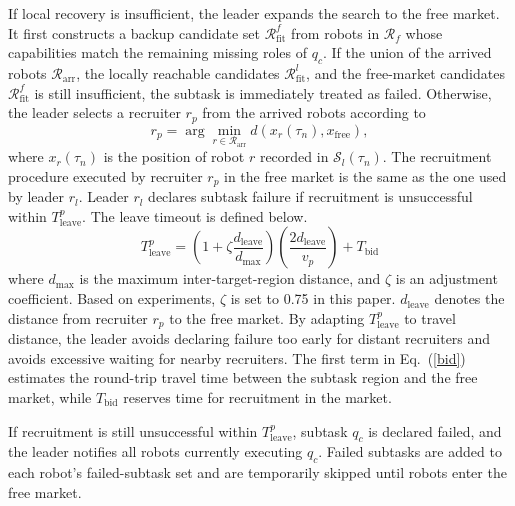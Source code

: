 \documentclass[lettersize,journal]{IEEEtran}
\begin{document}
If local recovery is insufficient, the leader expands the search to the free market. It first constructs a backup candidate set $\mathcal{R}_{\mathrm{fit}}^{f}$ from robots in $\mathcal{R}_f$ whose capabilities match the remaining missing roles of $q_c$. If the union of the arrived robots $\mathcal{R}_{\mathrm{arr}}$, the locally reachable candidates $\mathcal{R}_{\mathrm{fit}}^{l}$, and the free-market candidates $\mathcal{R}_{\mathrm{fit}}^{f}$ is still insufficient, the subtask is immediately treated as failed. Otherwise, the leader selects a recruiter $r_p$ from the arrived robots according to
\begin{equation*}
    r_p = \arg\min_{r \in \mathcal{R}_{\mathrm{arr}}} d(x_r(\tau_n), x_{\mathrm{free}}),
\end{equation*}
where $x_r(\tau_n)$ is the position of robot $r$ recorded in $\mathcal{S}_l(\tau_n)$. The recruitment procedure executed by recruiter $r_p$ in the free market is the same as the one used by leader $r_l$. Leader $r_l$ declares subtask failure if recruitment is unsuccessful within $T^p_\mathrm{leave}$. The leave timeout is defined below.
\begin{equation} \label{bid}
	T^p_\mathrm{leave} = \left(1 + \zeta \frac{d_\mathrm{leave}}{d_{\max}}\right) \left( \frac{2d_{\mathrm{leave}}}{v_p} \right) + T_{\mathrm{bid}}
\end{equation}
where \(d_{\max}\) is the maximum inter-target-region distance, and \(\zeta\) is an adjustment coefficient. Based on experiments, $\zeta$ is set to 0.75 in this paper. $d_{\mathrm{leave}}$ denotes the distance from recruiter $r_p$ to the free market. By adapting $T^p_\mathrm{leave}$ to travel distance, the leader avoids declaring failure too early for distant recruiters and avoids excessive waiting for nearby recruiters. The first term in Eq.~(\ref{bid}) estimates the round-trip travel time between the subtask region and the free market, while $T_{\mathrm{bid}}$ reserves time for recruitment in the market.

If recruitment is still unsuccessful within $T^p_\mathrm{leave}$, subtask $q_c$ is declared failed, and the leader notifies all robots currently executing $q_c$. Failed subtasks are added to each robot's failed-subtask set and are temporarily skipped until robots enter the free market.

\end{document}
